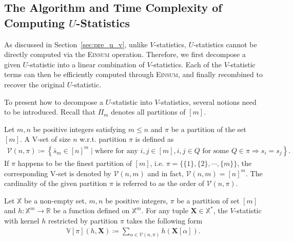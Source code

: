 \documentclass[twoside,11pt]{article}
\def\Einsum{\textsc{Einsum}}
\def\calV{\mathcal{V}}
\newcommand{\pdfu}{\texorpdfstring{$U$}{U}}
\newcommand{\sPi}{\pi}
\newcommand{\vset}{\calV}
\newcommand{\vsetp}[2]{\vset(#1,#2)}
\newcommand{\vstat}{\mathbb{V}}
\newcommand{\partition}{\Pi}
\newcommand{\partitionp}[1]{\partition_{#1}}
\def\bbX{\mathbb{X}}
\def\bbR{\mathbb{R}}
\begin{document}
\subsection{The Algorithm and Time Complexity of Computing \pdfu{}-Statistics}
\label{sec:alg_u}

As discussed in Section~\ref{sec:pre_u_v}, unlike $V$-statistics, $U$-statistics cannot be directly computed via the \Einsum{} operation. Therefore, we first decompose a given $U$-statistic into a linear combination of $V$-statistics. Each of the $V$-statistic terms can then be efficiently computed through \Einsum{}, and finally recombined to recover the original $U$-statistic.

To present how to decompose a $U$-statistic into $V$-statistics, several notions need to be introduced. Recall that $\partitionp{m}$ denotes all partitions of $[m]$. %

\begin{definition}[V-Set]\label{def:v_set}
     Let $m,n$ be positive integers satisfying $m \leq n$ and $\sPi$ be a partition of the set $[m]$. A V-set of size $n$ w.r.t. partition $\sPi$ is defined as
    \begin{align*}
        \vsetp{n}{\sPi} \coloneqq \left\{ \bar{s}_{m} \in [n]^m \mid \text{where for any $i, j \in [m]$},i, j \in Q \text{ for some $Q \in \sPi$}  \Longrightarrow  s_i = s_j \right\}.
    \end{align*}
    If $\sPi$ happens to be the finest partition of $[m]$, i.e. $\sPi = \{\{1\}, \{2\}, \cdots, \{m\}\}$, the corresponding V-set is denoted by $\vsetp{n}{m}$ and in fact, $\vsetp{n}{m} = [n]^m$. The cardinality of the given partition $\sPi$ is referred to as the order of $\vsetp{n}{\sPi}$.
\end{definition}

\begin{definition}\label{def:res_v_stat}
Let $\bbX$ be a non-empty set, $m, n$ be positive integers, $\sPi$ be a partition of set $[m]$ and $h: \bbX^{m} \rightarrow \bbR$ be a function defined on $\bbX^m$. For any tuple $\bm{X} \in \bbX^*$, the $V$-statistic with kernel $h$ restricted by partition $\sPi$ takes the following form 
\begin{align*}
\vstat[\sPi](h,\bm{X}) \coloneqq \sum_{\alpha \in \vsetp{n}{\sPi}} h(\bm{X}[\alpha]). 
\end{align*}
\end{definition}
\end{document}
